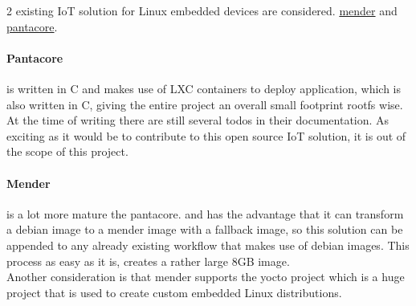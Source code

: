 \documentclass[../../main.tex]{subfiles}
\begin{document}
2 existing IoT solution for Linux embedded devices are considered.
\href{mender.io}{mender} and \href{pantahub.com}{pantacore}.\\

\paragraph{Pantacore}%
\label{par:pantacore}

is written in C and makes use of LXC containers to deploy application, which is also written in C,
giving the entire project an overall small footprint rootfs wise.\\
At the time of writing there are still several todos in their documentation. As exciting as it
would be to contribute to this open source IoT solution, it is out of the scope of this project.


\paragraph{Mender}%
\label{par:mender}

is a lot more mature the pantacore.  and has the advantage that it can transform a debian image
to a mender image with a fallback image, so this solution can be appended to any already 
existing workflow that makes use of debian images. This process as easy as it is, creates a
rather large 8GB image.\\

Another consideration is that mender supports the yocto project which is a huge project that is
used to create custom embedded Linux distributions.




	
\end{document}
